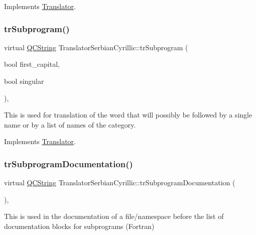 Implements \mbox{\hyperlink{class_translator}{Translator}}.

\mbox{\label{class_translator_serbian_cyrillic_a53faf51c1508a37733276e401ac80f79}} 
\subsubsection{\texorpdfstring{trSubprogram()}{trSubprogram()}}
{\footnotesize\ttfamily virtual \mbox{\hyperlink{class_q_c_string}{Q\+C\+String}} Translator\+Serbian\+Cyrillic\+::tr\+Subprogram (\begin{DoxyParamCaption}\item[{bool}]{first\+\_\+capital,  }\item[{bool}]{singular }\end{DoxyParamCaption})\hspace{0.3cm}{\ttfamily [inline]}, {\ttfamily [virtual]}}

This is used for translation of the word that will possibly be followed by a single name or by a list of names of the category. 

Implements \mbox{\hyperlink{class_translator}{Translator}}.

\mbox{\label{class_translator_serbian_cyrillic_aac60333c685f46fe9c49597e39d75c7b}} 
\subsubsection{\texorpdfstring{trSubprogramDocumentation()}{trSubprogramDocumentation()}}
{\footnotesize\ttfamily virtual \mbox{\hyperlink{class_q_c_string}{Q\+C\+String}} Translator\+Serbian\+Cyrillic\+::tr\+Subprogram\+Documentation (\begin{DoxyParamCaption}{ }\end{DoxyParamCaption})\hspace{0.3cm}{\ttfamily [inline]}, {\ttfamily [virtual]}}

This is used in the documentation of a file/namespace before the list of documentation blocks for subprograms (Fortran) 

